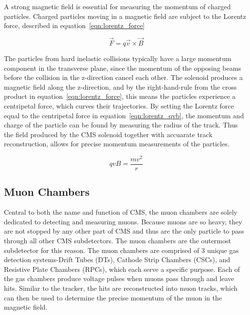 A strong magnetic field is essential for measuring the momentum of charged particles. Charged particles moving in a magnetic field are subject to the Lorentz force, described in
equation~\ref{eqn:lorentz_force} 

\begin{equation}
\label{eqn:lorentz_force}
 \vec{F} = q\vec{v} \times \vec{B}
\end{equation}

The particles from hard inelastic collisions typically have a large momentum component in the transverse plane, since the momentum of the opposing beams before the collision in the z-direction cancel each other.
The solenoid produces a magnetic field along the z-direction, and by the right-hand-rule from the cross product in equation~\ref{eqn:lorentz_force}, this means the particles experience a centripetal force, which
curves their trajectories. By setting the Lorentz force equal to the centripetal force in equation~\ref{eqn:lorentz_qvb}, the momentum and charge of the particle can be found by measuring the radius of the track. 
Thus the field produced by the CMS solenoid together with accuarate track reconstruction, allows for precise momentum measurements of the particles.

\begin{equation}
\label{eqn:lorentz_qvb}
 qvB = \frac{mv^{2}}{r}
\end{equation}

\subsection{Muon Chambers}
Central to both the name and function of CMS, the muon chambers are solely dedicated to detecting and measuring muons.
Because muons are so heavy, they are not stopped by any other part of CMS and thus are the only particle to pass through all other CMS subdetectors. The muon chambers are the outermost subdetector for this reason. The muon chambers are comprised of 3 unique gas detection systems-Drift Tubes (DTs), Cathode Strip Chambers (CSCs), and Resistive Plate Chambers (RPCs), which each serve a specific purpose. Each of the gas chambers produce voltage pulses when muons pass through and leave hits. Similar to the tracker, the hits are reconstructed into muon tracks, which can then be used to determine the precise momentum of the muon in the magnetic field.  

